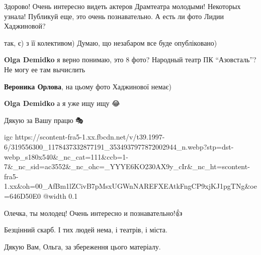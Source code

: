  
 
 
 
 

\qqSecCmt


Здорово! Очень интересно видеть актеров Драмтеатра молодыми! Некоторых узнала! Публикуй еще, это очень познавательно. А есть ли фото Лидии Хаджиновой?

\begin{itemize} %

так, є) з її колективом) Думаю, що незабаром все буде опубліковано)

\textbf{Olga Demidko} я верно понимаю, это 8 фото? Народный театр ПК \enquote{Азовсталь}? Не могу ее там вычислить 🫣

\textbf{Вероника Орлова}, на цьому фото Хаджинової немає)

\textbf{Olga Demidko} а я уже ищу ищу 😂

\end{itemize} %


Дякую за Вашу працю🙏🎭


\ifcmt
  igc https://scontent-fra5-1.xx.fbcdn.net/v/t39.1997-6/319556300_1178437332877191_3534937977872002944_n.webp?stp=dst-webp_s180x540&_nc_cat=111&ccb=1-7&_nc_sid=ac3552&_nc_ohc=_YYYE6KO230AX9y_cIr&_nc_ht=scontent-fra5-1.xx&oh=00_AfBm1lZCivB7pMsxUGWnNAREFXEAtkFngCP9xjKJ1pgTNg&oe=646D50E0
  @width 0.1
\fi


Олечка, ты молодец! Очень интересно и познавательно!👍


Безцінний скарб. І тих людей нема, і театрів, і міста.


Дякую Вам, Ольга, за збереження цього матеріалу.


